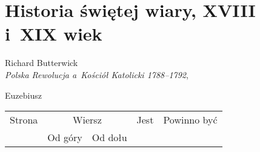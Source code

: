 \documentclass[a4paper,11pt]{article}
\begin{document}
\VerSpaceSix













\newpage

\section{Historia świętej wiary, XVIII i~XIX wiek}



{ %
  Richard Butterwick \\
  \textit{Polska Rewolucja a~Kościół Katolicki 1788--1792},
  \cite{ButterwickPolskaRewolucjaAKosciolKatolicki2012}}

\vspace{0em}



\vspace{0em}


\noindent
{} Euzebiusz \\




\begin{center}

  \begin{tabular}{|c|c|c|c|c|}
    \hline
    Strona & \multicolumn{2}{c|}{Wiersz} & Jest
                              & Powinno być \\ \cline{2-3}
    & Od góry & Od dołu & & \\
    \hline
    \hline
  \end{tabular}

\end{center}

\VerSpaceSix












\newpage
\end{document}
